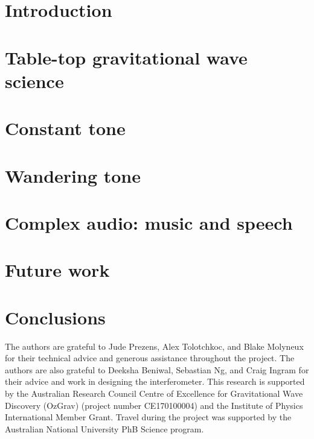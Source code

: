 \documentclass[pra,superscriptaddress,reprint,amsmath,amssymb,nofootinbib]{revtex4-1}
\begin{document}
\maketitle

\section{Introduction}
\label{sec:introduction}



\section{Table-top gravitational wave science}
\label{sec:ifo}



\section{Constant tone}
\label{sec:single_tone}


 
\section{Wandering tone}
\label{sec:viterbi_wandering}



\section{Complex audio: music and speech}
\label{sec:optical_microphone}



\section{Future work}
\label{sec:future_work}



\section{Conclusions}
\label{sec:conclusions}



\begin{acknowledgments}
The authors are grateful to Jude Prezens, Alex Tolotchkoc, and Blake Molyneux for their technical advice and generous assistance throughout the project.
The authors are also grateful to Deeksha Beniwal, Sebastian Ng, and Craig Ingram for their advice and work in designing the interferometer. 
This research is supported by the Australian Research Council Centre of Excellence for Gravitational Wave Discovery (OzGrav) (project number CE170100004) and the Institute of Physics International Member Grant.
Travel during the project was supported by the Australian National University PhB Science program.

\end{acknowledgments}






\newpage
\appendix

\end{document}
